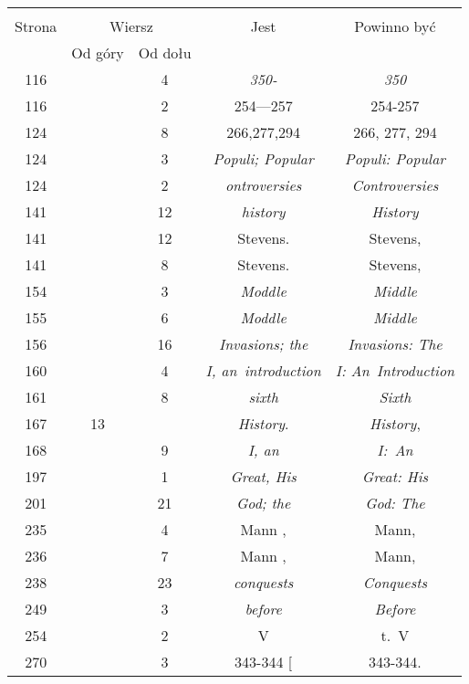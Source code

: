 \documentclass[a4paper,11pt]{article}
\begin{document}
\begin{center}
  \begin{tabular}{|c|c|c|c|c|}
    \hline
    & \multicolumn{2}{c|}{} & & \\
    Strona & \multicolumn{2}{c|}{Wiersz} & Jest
                              & Powinno być \\ \cline{2-3}
    & Od góry & Od dołu & & \\
    \hline
    116 & &  4 & \textit{350-} & \textit{350} \\
    116 & &  2 & 254---257 & 254-257 \\
    124 & &  8 & 266,277,294 & 266, 277, 294 \\
    124 & &  3 & \textit{Populi; Popular} & \textit{Populi: Popular} \\
    124 & &  2 & \textit{ontroversies} & \textit{Controversies} \\
    141 & & 12 & \textit{history} & \textit{History} \\
    141 & & 12 & Stevens. & Stevens, \\
    141 & &  8 & Stevens. & Stevens, \\
    154 & &  3 & \textit{Moddle} & \textit{Middle} \\
    155 & &  6 & \textit{Moddle} & \textit{Middle} \\
    156 & & 16 & \textit{Invasions; the} & \textit{Invasions: The} \\
    160 & &  4 & \textit{I, an~introduction}
           & \textit{I: An~Introduction} \\
    161 & &  8 & \textit{sixth} & \textit{Sixth} \\
    167 & 13 & & \textit{History}. & \textit{History}, \\
    168 & &  9 & \textit{I, an} & \textit{I:~An} \\
    197 & &  1 & \textit{Great, His} & \textit{Great: His} \\
    201 & & 21 & \textit{God; the} & \textit{God: The} \\
    235 & &  4 & Mann , & Mann, \\
    236 & &  7 & Mann , & Mann, \\
    238 & & 23 & \textit{conquests} & \textit{Conquests} \\
    249 & &  3 & \textit{before} & \textit{Before} \\
    254 & &  2 & V & t.~V \\
    270 & &  3 & 343-344 [ & 343-344. \\

\end{tabular}
\end{center}
\end{document}
